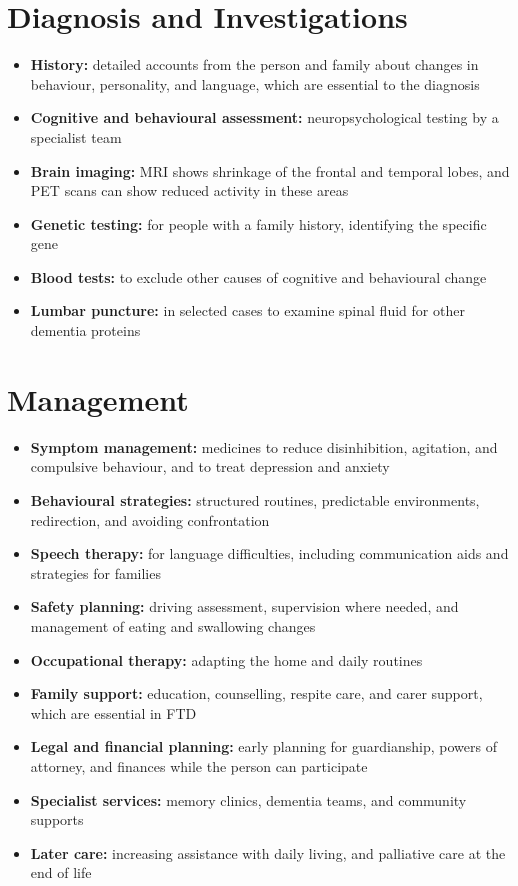 \section*{Diagnosis and Investigations}
\begin{itemize}
    \item \textbf{History:} detailed accounts from the person and family about changes in behaviour, personality, and language, which are essential to the diagnosis
    \item \textbf{Cognitive and behavioural assessment:} neuropsychological testing by a specialist team
    \item \textbf{Brain imaging:} MRI shows shrinkage of the frontal and temporal lobes, and PET scans can show reduced activity in these areas
    \item \textbf{Genetic testing:} for people with a family history, identifying the specific gene
    \item \textbf{Blood tests:} to exclude other causes of cognitive and behavioural change
    \item \textbf{Lumbar puncture:} in selected cases to examine spinal fluid for other dementia proteins
\end{itemize}

\section*{Management}
\begin{itemize}
    \item \textbf{Symptom management:} medicines to reduce disinhibition, agitation, and compulsive behaviour, and to treat depression and anxiety
    \item \textbf{Behavioural strategies:} structured routines, predictable environments, redirection, and avoiding confrontation
    \item \textbf{Speech therapy:} for language difficulties, including communication aids and strategies for families
    \item \textbf{Safety planning:} driving assessment, supervision where needed, and management of eating and swallowing changes
    \item \textbf{Occupational therapy:} adapting the home and daily routines
    \item \textbf{Family support:} education, counselling, respite care, and carer support, which are essential in FTD
    \item \textbf{Legal and financial planning:} early planning for guardianship, powers of attorney, and finances while the person can participate
    \item \textbf{Specialist services:} memory clinics, dementia teams, and community supports
    \item \textbf{Later care:} increasing assistance with daily living, and palliative care at the end of life
\end{itemize}

